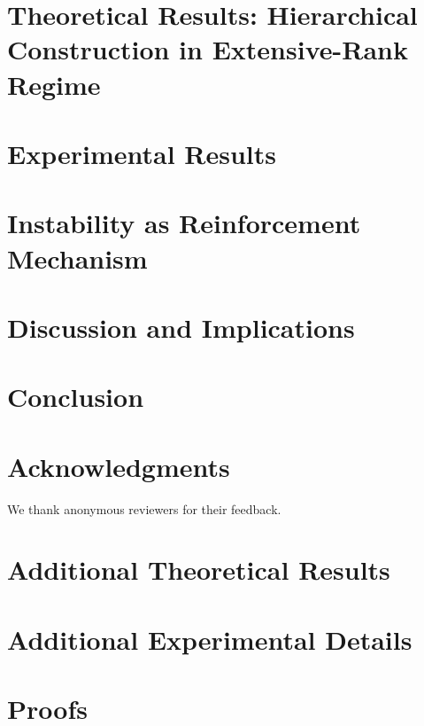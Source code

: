 \documentclass{article}
\newcommand{\1}{\mathbbm{1}}
\theoremstyle{plain}
\theoremstyle{definition}
\begin{document}
\section{Theoretical Results: Hierarchical Construction in Extensive-Rank Regime}
\label{sec:theory}



\section{Experimental Results}
\label{sec:experiments}



\section{Instability as Reinforcement Mechanism}
\label{sec:instability}



\section{Discussion and Implications}
\label{sec:discussion}



\section{Conclusion}
\label{sec:conclusion}



\section*{Acknowledgments}
We thank anonymous reviewers for their feedback.




\appendix
\section{Additional Theoretical Results}
\label{app:theory}



\section{Additional Experimental Details}
\label{app:experiments}



\section{Proofs}
\label{app:proofs}


\end{document}
